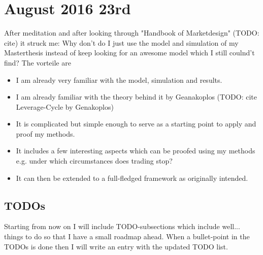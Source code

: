 \section*{August 2016 23rd}
After meditation and after looking through "Handbook of Marketdesign" (TODO: cite) it struck me: Why don't do I just use the model and simulation of my Masterthesis instead of keep looking for an awesome model which I still coulnd't find? The vorteile are

\begin{itemize}
\item I am already very familiar with the model, simulation and results.
\item I am already familiar with the theory behind it by Geanakoplos (TODO: cite Leverage-Cycle by Genakoplos)
\item It is complicated but simple enough to serve as a starting point to apply and proof my methods.
\item It includes a few interesting aspects which can be proofed using my methods e.g. under which circumstances does trading stop?
\item It can then be extended to a full-fledged framework as originally intended.
\end{itemize}

\subsection*{TODOs}
Starting from now on I will include TODO-subsections which include well... things to do so that I have a small roadmap ahead. When a bullet-point in the TODOs is done then I will write an entry with the updated TODO list. \bigskip

